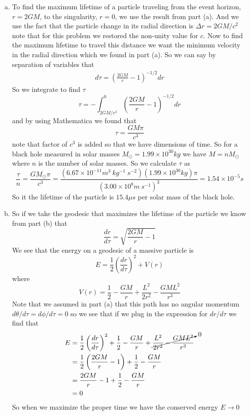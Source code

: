 \documentclass[11pt]{article}
\numberwithin{equation}{section}
\begin{document}
\begin{enumerate}[(a)]
\item
To find the maximum lifetime of a particle traveling from the event horizon, $r=2GM$, to the singularity, $r=0$, we use the result from part (a). And we use the fact that the particle change in its radial direction is $\Delta r = 2GM/c^2$ note that for this problem we restored the non-unity value for $c$. Now to find the maximum lifetime to travel this distance we want the minimum velocity in the radial direction which we found in part (a). So we can say by separation of variables that
\begin{align*}
d\tau = \left(\frac{2GM}{r}-1\right)^{-1/2}dr
\end{align*}
So we integrate to find $\tau$
$$\tau = -\int_{2GM/c^2}^{0}\left(\frac{2GM}{r}-1\right)^{-1/2}dr$$
and by using Mathematica we found that
$$\tau = \frac{GM\pi}{c^3}$$
note that factor of $c^3$ is added so that we have dimensions of time. So for a black hole measured in solar masses $M_{\odot} = 1.99\times10^{30}\unit{kg}$ we have $M = nM_{\odot}$ where $n$ is the number of solar masses. So we calculate $\tau$ as
$$\frac{\tau}{n} = \frac{GM_{\odot}\pi}{c^3} = \frac{(6.67\times10^{-11}\unit{m^{3}\ kg^{-1}\ s^{-2}})(1.99\times10^{30}\unit{kg})\pi}{(3.00\times10^{8}\unit{m\ s^{-1}})^{3}} = 1.54\times10^{-5}\unit{s}$$
So it the lifetime of the particle is $15.4\unit{\mu s}$ per solar mass of the black hole.

\item
So if we take the geodesic that maximizes the lifetime of the particle we know from part (b) that
$$\frac{dr}{d\tau} = \sqrt{\frac{2GM}{r}-1}$$
We see that the energy on a geodesic of a massive particle is
$$E = \frac{1}{2}\left(\frac{dr}{d\tau}\right)^2 + V(r)$$
where
$$V(r) = \frac{1}{2} - \frac{GM}{r} + \frac{L^2}{2r^2} - \frac{GML^2}{r^3}$$
Note that we assumed in part (a) that this path has no angular momentum $d\theta/d\tau = d\phi/d\tau = 0$ so we see that if we plug in the expression for $dr/d\tau$ we find that
\begin{align*}
E &= \frac{1}{2}\left(\frac{dr}{d\tau}\right)^2 + \frac{1}{2} - \frac{GM}{r} + \cancelto{0}{\frac{L^2}{2r^2} - \frac{GML^2}{r^3}}\\
&= \frac{1}{2}\left(\frac{2GM}{r}-1\right) + \frac{1}{2} - \frac{GM}{r} \\
&= \frac{2GM}{r} - 1 + \frac{1}{2} - \frac{GM}{r} \\
&= 0
\end{align*}
So when we maximize the proper time we have the conserved energy $E\rightarrow 0$
\end{enumerate}
\end{document}
